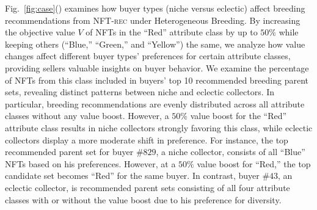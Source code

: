 \documentclass[conference]{IEEEtran}
\newcommand{\1}[1]{\mathds{1}\left[#1\right]}
\theoremstyle{plain}
\newcommand{\heterb}{Heterogeneous Breeding\xspace}
\newcommand{\finddemand}{\textsc{NFT-rec}\xspace}
\begin{document}
{Fig.~\ref{fig:case}()  examines how buyer types (niche versus eclectic) affect breeding recommendations from \finddemand under \heterb. By increasing the objective value $V$ of NFTs in the ``Red'' attribute class by up to $50\%$ while keeping others (``Blue,'' ``Green,'' and ``Yellow'') the same, we analyze how value changes affect different buyer types' preferences for certain attribute classes, providing sellers valuable insights on buyer behavior. We examine the percentage of NFTs from this class included in buyers' top 10 recommended breeding parent sets, revealing distinct patterns between niche and eclectic collectors. In particular, breeding recommendations are evenly distributed across all attribute classes without any value boost. However, a $50\%$ value boost for the ``Red'' attribute class results in niche collectors strongly favoring this class, while eclectic collectors display a more moderate shift in preference. For instance, the top recommended parent set for buyer $\#829$, a niche collector, consists of all ``Blue'' NFTs based on his preferences. However, at a $50\%$ value boost for ``Red,'' the top candidate set becomes ``Red'' for the same buyer. In contrast, buyer $\#43$, an eclectic collector, is recommended parent sets consisting of all four attribute classes with or without the value boost due to his preference for diversity.
}
\end{document}
